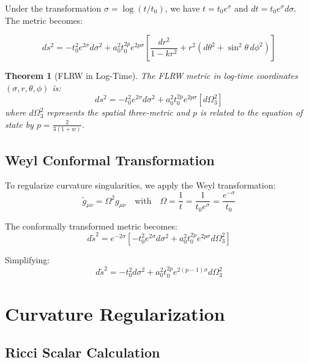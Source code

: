 \documentclass[11pt,a4paper]{article}
\newtheorem{theorem}{Theorem}[section]
\begin{document}
Under the transformation $\sigma = \log(t/t_0)$, we have $t = t_0 e^{\sigma}$ and $dt = t_0 e^{\sigma} d\sigma$. The metric becomes:

\begin{equation}
ds^2 = -t_0^2 e^{2\sigma} d\sigma^2 + a_0^2 t_0^{2p} e^{2p\sigma} \left[\frac{dr^2}{1-kr^2} + r^2(d\theta^2 + \sin^2\theta \, d\phi^2)\right]
\end{equation}

\begin{theorem}[FLRW in Log-Time]
The FLRW metric in log-time coordinates $(\sigma, r, \theta, \phi)$ is:
\begin{equation}
ds^2 = -t_0^2 e^{2\sigma} d\sigma^2 + a_0^2 t_0^{2p} e^{2p\sigma} \left[d\Omega_3^2\right]
\end{equation}
where $d\Omega_3^2$ represents the spatial three-metric and $p$ is related to the equation of state by $p = \frac{2}{3(1+w)}$.
\end{theorem}

\subsection{Weyl Conformal Transformation}

To regularize curvature singularities, we apply the Weyl transformation:
\begin{equation}
\tilde{g}_{\mu\nu} = \Omega^2 g_{\mu\nu} \quad \text{with} \quad \Omega = \frac{1}{t} = \frac{1}{t_0 e^{\sigma}} = \frac{e^{-\sigma}}{t_0}
\end{equation}

The conformally transformed metric becomes:
\begin{equation}
d\tilde{s}^2 = e^{-2\sigma} \left[-t_0^2 e^{2\sigma} d\sigma^2 + a_0^2 t_0^{2p} e^{2p\sigma} d\Omega_3^2\right]
\end{equation}

Simplifying:
\begin{equation}
d\tilde{s}^2 = -t_0^2 d\sigma^2 + a_0^2 t_0^{2p} e^{2(p-1)\sigma} d\Omega_3^2
\end{equation}

\section{Curvature Regularization}

\subsection{Ricci Scalar Calculation}
\end{document}
